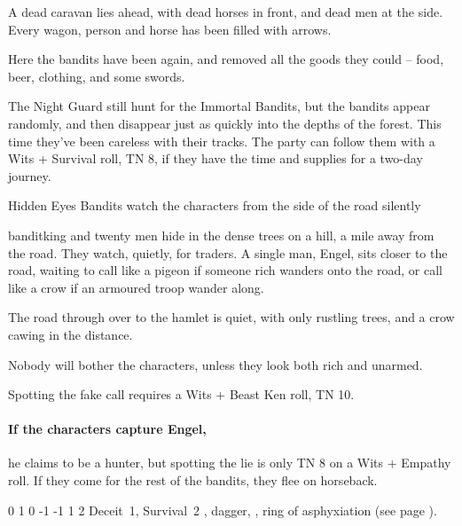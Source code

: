 \begin{multicols}{2}
\begin{boxtext}

	A dead caravan lies ahead, with dead horses in front, and dead men at the side.  Every wagon, person and horse has been filled with arrows.

\end{boxtext}

Here the bandits have been again, and removed all the goods they could -- food, beer, clothing, and some swords.

The Night Guard still hunt for the Immortal Bandits, but the bandits appear randomly, and then disappear just as quickly into the depths of the forest.
This time they've been careless with their tracks.
The party can follow them with a Wits + Survival roll, TN 8, if they have the time and supplies for a two-day journey.

{Hidden Eyes}%
{Bandits watch the characters from the side of the road silently}%

\gls{banditking} and twenty men hide in the dense trees on a hill, a mile away from the road.
They watch, quietly, for traders.
A single man, Engel, sits closer to the road, waiting to call like a pigeon if someone rich wanders onto the road, or call like a crow if an armoured troop wander along.

\begin{boxtext}

	The road through over to the hamlet is quiet, with only rustling trees, and a crow cawing in the distance.

\end{boxtext}

Nobody will bother the characters, unless they look both rich and unarmed.

Spotting the fake call requires a Wits + Beast Ken roll, TN 10.

\paragraph{If the characters capture Engel,}
he claims to be a hunter, but spotting the lie is only TN 8 on a Wits + Empathy roll.
If they come for the rest of the bandits, they flee on horseback.


{0}%
{1}%
{{0}%
{-1}%
{-1}}%
{1}%
{2}%
{Deceit~1, Survival~2}%
{\shortsword, dagger, \partialleather, ring of asphyxiation (see page \pageref{ring_asphyxiation}).}%
{}


\end{multicols}
